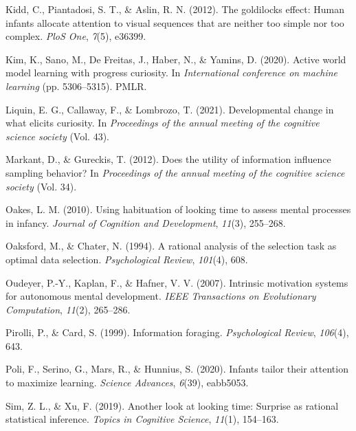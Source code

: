 \documentclass[10pt, letterpaper]{article}
\newenvironment{CSLReferences}%
  {}%
  {\par}
\begin{document}
\begin{CSLReferences}{1}{0}
\leavevmode{}%
Kidd, C., Piantadosi, S. T., \& Aslin, R. N. (2012). The goldilocks
effect: Human infants allocate attention to visual sequences that are
neither too simple nor too complex. \emph{PloS One}, \emph{7}(5),
e36399.

\leavevmode{}%
Kim, K., Sano, M., De Freitas, J., Haber, N., \& Yamins, D. (2020).
Active world model learning with progress curiosity. In
\emph{International conference on machine learning} (pp. 5306--5315).
PMLR.

\leavevmode{}%
Liquin, E. G., Callaway, F., \& Lombrozo, T. (2021). Developmental
change in what elicits curiosity. In \emph{Proceedings of the annual
meeting of the cognitive science society} (Vol. 43).

\leavevmode{}%
Markant, D., \& Gureckis, T. (2012). Does the utility of information
influence sampling behavior? In \emph{Proceedings of the annual meeting
of the cognitive science society} (Vol. 34).

\leavevmode{}%
Oakes, L. M. (2010). Using habituation of looking time to assess mental
processes in infancy. \emph{Journal of Cognition and Development},
\emph{11}(3), 255--268.

\leavevmode{}%
Oaksford, M., \& Chater, N. (1994). A rational analysis of the selection
task as optimal data selection. \emph{Psychological Review},
\emph{101}(4), 608.

\leavevmode{}%
Oudeyer, P.-Y., Kaplan, F., \& Hafner, V. V. (2007). Intrinsic
motivation systems for autonomous mental development. \emph{IEEE
Transactions on Evolutionary Computation}, \emph{11}(2), 265--286.

\leavevmode{}%
Pirolli, P., \& Card, S. (1999). Information foraging.
\emph{Psychological Review}, \emph{106}(4), 643.

\leavevmode{}%
Poli, F., Serino, G., Mars, R., \& Hunnius, S. (2020). Infants tailor
their attention to maximize learning. \emph{Science Advances},
\emph{6}(39), eabb5053.

\leavevmode{}%
Sim, Z. L., \& Xu, F. (2019). Another look at looking time: Surprise as
rational statistical inference. \emph{Topics in Cognitive Science},
\emph{11}(1), 154--163.


\end{CSLReferences}
\end{document}
